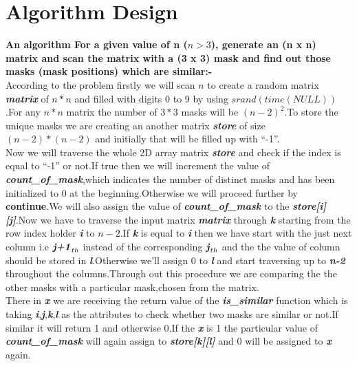 \documentclass[conference]{IEEEtran}
\begin{document}
\section{\textbf{Algorithm Design}}
\textbf{An algorithm For a given value of n ($n > 3 $), generate an (n x n) matrix and scan the matrix with a (3 x 3) mask and find out those masks (mask positions) which are similar:-}\\

According to the problem firstly we will scan $n$ to create a random matrix \textbf{\textit{matrix}} of $n * n$ and filled with digits  0 to 9 by using $srand(time(NULL))$.For any $n * n$ matrix the number of $3 * 3$ masks will be $(n-2)^2$.To store the unique masks we are creating an another matrix \textbf{\textit{store}} of size $(n-2) * (n-2)$ and initially that will be filled up with “-1”.\\

Now we will traverse the whole 2D array matrix \textbf{\textit{store}} and check if the index is equal to “-1” or not.If true then we will increment the value of \textbf{\textit{count\_of\_mask}},which indicates the number of distinct masks and has been initialized to 0 at the beginning.Otherwise we will proceed further by \textbf{continue}.We will also assign the value of \textbf{\textit{count\_of\_mask}} to the \textbf{\textit{store[i][j]}}.Now we have to traverse the input matrix \textbf{\textit{matrix}} through \textbf{\textit{k}} starting from the row index holder \textbf{\textit{i}} to $n-2$.If \textbf{\textit{k}} is equal to \textbf{\textit{i}} then we have start with the just next column i.e ${\textbf{\textit{j+1}}}_{th}$ instead of the corresponding ${\textbf{\textit{j}}}_{th}$ and the the value of column should be stored in \textbf{\textit{l}}.Otherwise we’ll assign 0 to \textbf{\textit{l}} and start traversing up to \textbf{\textit{n-2}} throughout the columns.Through out this procedure we are comparing the the other masks with a particular mask,chosen from the matrix.\\

There in \textbf{\textit{x}} we are receiving the return value of the \textbf{\textit{is\_similar}} function which is taking \textbf{\textit{i}},\textbf{\textit{j}},\textbf{\textit{k}},\textbf{\textit{l}} as the attributes to check whether two masks are similar or not.If similar it will return 1 and otherwise 0.If the \textbf{\textit{x}} is 1 the particular value of \textbf{\textit{count\_of\_mask}} will again assign to \textbf{\textit{store[k][l]}} and 0 will be assigned to \textbf{\textit{x}} again.\\
\end{document}
